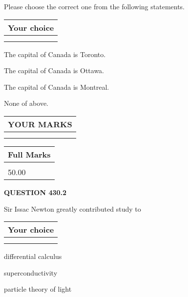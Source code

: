\documentclass[12pt]{article}
\begin{document}
  
Please choose the correct one from the following statements.
  
  
\noindent\hspace{3.0in} \begin{tabular}{|l|}
\hline
Your choice \\
\hline
 \\ 
 \\ 
\hline
\end{tabular}
  
  
 
 
The capital of Canada is Toronto.
 
 
The capital of Canada is Ottawa.
 
 
The capital of Canada is Montreal.
 
 
 None of above.
 
 
  
\vspace{0.2in}
  
\noindent\begin{tabular}{|l|}
\hline
 YOUR MARKS  \\
\hline
 \\ 
 \\ 
\hline
\end{tabular}
\hspace{0.05in} \begin{tabular}{|l|}
\hline
 Full Marks  \\
\hline
 \\ 
50.00 \\
\hline
\end{tabular}
{\textbf{\Large{QUESTION
430.2 
}}}
  
  
Sir Issac Newton greatly contributed study to
  
  
\noindent\hspace{3.0in} \begin{tabular}{|l|}
\hline
Your choice \\
\hline
 \\ 
 \\ 
\hline
\end{tabular}
  
  
 
 
differential calculus
 
 
superconductivity
 
 
particle theory of light
 
\end{document}
